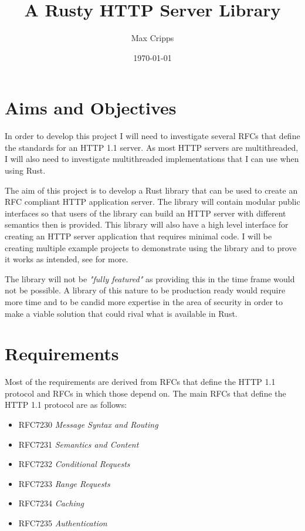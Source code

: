 \documentclass[12pt, a4paper]{article}
\title{A Rusty HTTP Server Library}
\author{Max Cripps}
\date{\today}
\begin{document}
\maketitle 

\section{Aims and Objectives}

In order to develop this project I will need to investigate several RFCs that define the standards
for an HTTP 1.1 server. As most HTTP servers are multithreaded, I will also need to investigate multithreaded
implementations that I can use when using Rust. 

The aim of this project is to develop a Rust library that can be used to create an RFC compliant
HTTP application server. The library will contain modular public interfaces so that users of the
library can build an HTTP server with different semantics then is provided. This library will also
have a high level interface for creating an HTTP server application that requires minimal code. I will
be creating multiple example projects to demonstrate using the library and to prove it works as intended,
see \emph{} for more.

The library will not be \emph{"fully featured"} as providing this in the time frame would not be
possible. A library of this nature to be production ready would require more time and to be candid
more expertise in the area of security in order to make a viable solution that could rival what is
available in Rust.

\section{Requirements} \label{sec:requirements}

Most of the requirements are derived from RFCs that define the HTTP 1.1 protocol and RFCs in which
those depend on. The main RFCs that define the HTTP 1.1 protocol are as follows:
\begin{itemize}
  \item RFC7230 \emph{Message Syntax and Routing}
  \item RFC7231 \emph{Semantics and Content}
  \item RFC7232 \emph{Conditional Requests}
  \item RFC7233 \emph{Range Requests}
  \item RFC7234 \emph{Caching}
  \item RFC7235 \emph{Authentication}
\end{itemize}
\end{document}
